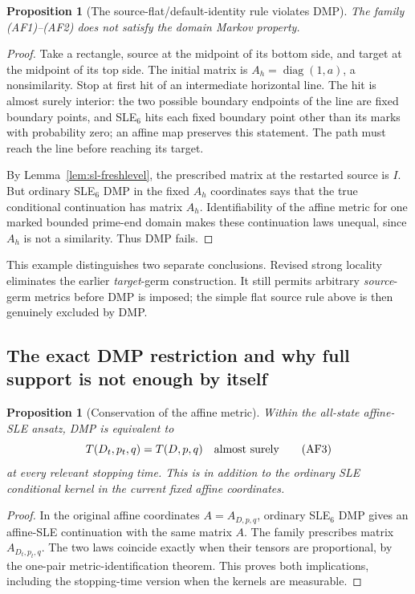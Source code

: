 \documentclass[11pt]{article}
\newtheorem{proposition}[theorem]{Proposition}
\theoremstyle{definition}\newtheorem{definition}[theorem]{Definition}
\theoremstyle{remark}\newtheorem{remark}[theorem]{Remark}
\begin{document}
\begin{proposition}[The source-flat/default-identity rule violates DMP]
\label{prop:sl-flatfailsdmp}
The family (AF1)--(AF2) does not satisfy the domain Markov property.
\end{proposition}
\begin{proof}
Take a rectangle, source at the midpoint of its bottom side, and target at
the midpoint of its top side. The initial matrix is
$A_h=\operatorname{diag}(1,a)$, a nonsimilarity. Stop at first hit of an
intermediate horizontal line. The hit is almost surely interior: the two
possible boundary endpoints of the line are fixed boundary points, and
SLE$_6$ hits each fixed boundary point other than its marks with probability
zero; an affine map preserves this statement. The path must reach the line
before reaching its target.

By Lemma~\ref{lem:sl-freshlevel}, the prescribed matrix at the restarted
source is $I$. But ordinary SLE$_6$ DMP in the fixed $A_h$ coordinates says
that the true conditional continuation has matrix $A_h$. Identifiability
of the affine metric for one marked bounded prime-end domain makes these
continuation laws unequal, since $A_h$ is not a similarity. Thus DMP fails.
\end{proof}

This example distinguishes two separate conclusions. Revised strong locality
eliminates the earlier \emph{target}-germ construction. It still permits
arbitrary \emph{source}-germ metrics before DMP is imposed; the simple flat
source rule above is then genuinely excluded by DMP.

\subsection{The exact DMP restriction and why full support is not enough by itself}

\begin{proposition}[Conservation of the affine metric]
\label{prop:sl-conservation}
Within the all-state affine-SLE ansatz, DMP is equivalent to
\[
 T(D_t,p_t,q)=T(D,p,q)\quad\hbox{almost surely}
 \tag{AF3}
\]
at every relevant stopping time. This is in addition to the ordinary SLE
conditional kernel in the current fixed affine coordinates.
\end{proposition}
\begin{proof}
In the original affine coordinates $A=A_{D,p,q}$, ordinary SLE$_6$ DMP gives
an affine-SLE continuation with the same matrix $A$. The family prescribes
matrix $A_{D_t,p_t,q}$. The two laws coincide exactly when their tensors
are proportional, by the one-pair metric-identification theorem. This proves
both implications, including the stopping-time version when the kernels are
measurable.
\end{proof}
\end{document}
